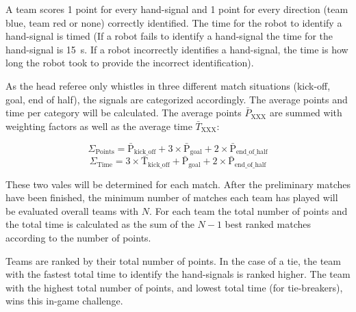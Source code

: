 A team scores 1 point for every hand-signal and 1 point for every direction (team blue, team red or none) correctly identified.
The time for the robot to identify a hand-signal is timed (If a robot fails to identify a hand-signal the time for the hand-signal is \qty{15}{\second}. If a robot incorrectly identifies a hand-signal, the time is how long the robot took to provide the incorrect identification).

As the head referee only whistles in three different match situations (kick-off, goal, end of half), the signals are categorized accordingly. The average points and time per category will be calculated. The average points $\bar{P}_{\mathrm{XXX}}$ are summed with weighting factors as well as the average time $\bar{T}_{\mathrm{XXX}}$:

\begin{equation*}
    \Sigma_\mathrm{Points} = \bar{\mathrm{P}}_{\mathrm{kick\_off}} + 3 \times \bar{\mathrm{P}}_{\mathrm{goal}} + 2 \times \bar{\mathrm{P}}_{\mathrm{end\_of\_half}}
\end{equation*}
\begin{equation*}
    \Sigma_\mathrm{Time} = 3 \times \bar{\mathrm{T}}_{\mathrm{kick\_off}} + \bar{\mathrm{P}}_{\mathrm{goal}} + 2 \times \bar{\mathrm{P}}_{\mathrm{end\_of\_half}}
\end{equation*}

These two vales will be determined for each match. After the preliminary matches have been finished, the minimum number of matches each team has played will be evaluated overall teams with $N$. For each team the total number of points and the total time is calculated as the sum of the $N - 1$ best ranked matches according to the number of points.

Teams are ranked by their total number of points. In the case of a tie, the team with the fastest total time to identify the hand-signals is ranked higher. The team with the highest total number of points, and lowest total time (for tie-breakers), wins this in-game challenge.